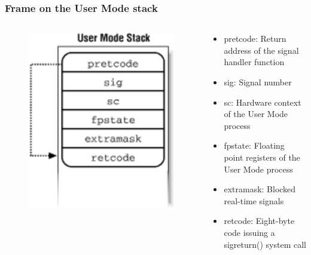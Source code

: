 % 
% 
\begin{frame}[fragile]
    \frametitle{Frame on the User Mode stack}
    \begin{columns}
    \begin{column}{0.5\textwidth}
        \begin{figure}
        \includegraphics[width=0.8\linewidth]{figs/signal-stack-frame.png}
        \end{figure}
	\end{column}
	\begin{column}{0.5\textwidth}
        \begin{itemize}
            \item pretcode: Return address of the signal handler function
            \item sig: Signal number \pause
            \item sc: Hardware context of the User Mode process
            \item fpstate: Floating point registers of the User Mode process
            \item extramask: Blocked real-time signals \pause
            \item retcode: Eight-byte code issuing a sigreturn() system call
        \end{itemize}
    \end{column}
	\end{columns}

\end{frame}
